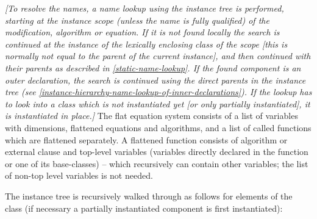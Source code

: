 \emph{{[}To resolve the names, a name lookup using the instance tree is
performed, starting at the instance scope (unless the name is fully
qualified) of the modification, algorithm or equation. If it is not
found locally the search is continued at the instance of the lexically
enclosing class of the scope {[}this is normally not equal to the parent
of the current instance{]}, and then continued with their parents as
described in \ref{static-name-lookup}. If the found component is an outer
declaration, the search is continued using the direct parents in the
instance tree (see \ref{instance-hierarchy-name-lookup-of-inner-declarations}). If the lookup has to look into a
class which is not instantiated yet [or only partially
  instantiated], it is instantiated in place.]}
  The flat equation system consists of a list of variables with
  dimensions, flattened equations and algorithms, and a list of called
functions which are flattened separately. A flattened function consists
of algorithm or external clause and top-level variables (variables
directly declared in the function or one of its base-classes) -- which
recursively can contain other variables; the list of non-top level
variables is not needed.

The instance tree is recursively walked through as follows for elements
of the class (if necessary a partially instantiated component is first
instantiated):


